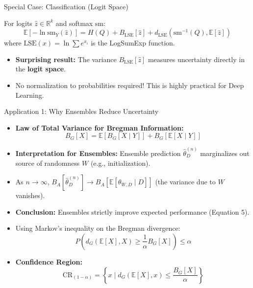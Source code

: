 \documentclass[aspectratio=169, 10pt]{beamer}
\begin{document}
\begin{frame}{Special Case: Classification (Logit Space)}
    \begin{corollary}
        For logits $\hat{z} \in \mathbb{R}^k$ and softmax $\text{sm}$:
        \[
        \mathbb{E}[-\ln \text{sm}_Y(\hat{z})] = H(Q) + B_{\text{LSE}}[\hat{z}] + d_{\text{LSE}}(\text{sm}^{-1}(Q), \mathbb{E}[\hat{z}])
        \]
        where $\text{LSE}(x) = \ln \sum e^{x_i}$ is the LogSumExp function.
    \end{corollary}
    \begin{itemize}
        \item \textbf{Surprising result:} The variance $B_{\text{LSE}}[\hat{z}]$ measures uncertainty directly in the \textbf{logit space}.
        \item No normalization to probabilities required! This is highly practical for Deep Learning.
    \end{itemize}
\end{frame}

\begin{frame}{Application 1: Why Ensembles Reduce Uncertainty}
    \begin{itemize}
        \item \textbf{Law of Total Variance for Bregman Information:}
        \[
        B_G[X] = \mathbb{E}[B_G[X \mid Y]] + B_G[\mathbb{E}[X \mid Y]]
        \]
        \item \textbf{Interpretation for Ensembles:} Ensemble prediction $\hat{\theta}_D^{(n)}$ marginalizes out source of randomness $W$ (e.g., initialization).
        \item As $n \to \infty$, $B_A[\hat{\theta}_D^{(n)}] \to B_A[\mathbb{E}[\theta_{W,D} \mid D]]$ (the variance due to $W$ vanishes).
        \item \textbf{Conclusion:} Ensembles strictly improve expected performance (Equation 5).
    \end{itemize}

    \begin{itemize}
        \item Using Markov's inequality on the Bregman divergence:
        \[
        P\left(d_G(\mathbb{E}[X], X) \ge \frac{1}{\alpha} B_G[X]\right) \le \alpha
        \]
        \item \textbf{Confidence Region:}
        \[
        \text{CR}_{(1-\alpha)} = \left\{ x \mid d_G(\mathbb{E}[X], x) \le \frac{B_G[X]}{\alpha} \right\}
        \]
    \end{itemize}
\end{frame}
\end{document}
